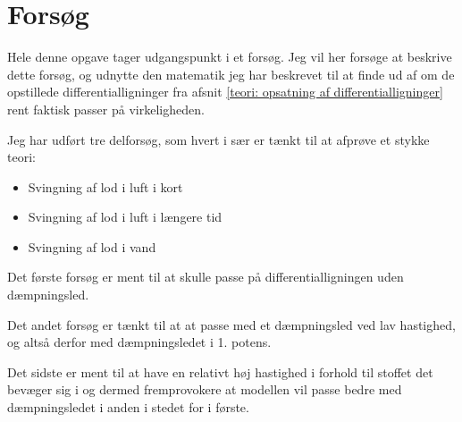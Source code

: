 \chapter{Forsøg}
Hele denne opgave tager udgangspunkt i et forsøg.
Jeg vil her forsøge at beskrive dette forsøg, og udnytte den matematik jeg har beskrevet til at finde ud af om de opstillede differentialligninger fra afsnit \ref{teori: opsatning af differentialligninger} rent faktisk passer på virkeligheden.

Jeg har udført tre delforsøg, som hvert i sær er tænkt til at afprøve et stykke teori:
\begin{itemize}
	\item Svingning af lod i luft i kort
	\item Svingning af lod i luft i længere tid
	\item Svingning af lod i vand
\end{itemize}

Det første forsøg er ment til at skulle passe på differentialligningen uden dæmpningsled.

Det andet forsøg er tænkt til at at passe med et dæmpningsled ved lav hastighed, og altså derfor med dæmpningsledet i 1. potens.

Det sidste er ment til at have en relativt høj hastighed i forhold til stoffet det bevæger sig i og dermed fremprovokere at modellen vil passe bedre med dæmpningsledet i anden i stedet for i første. 
